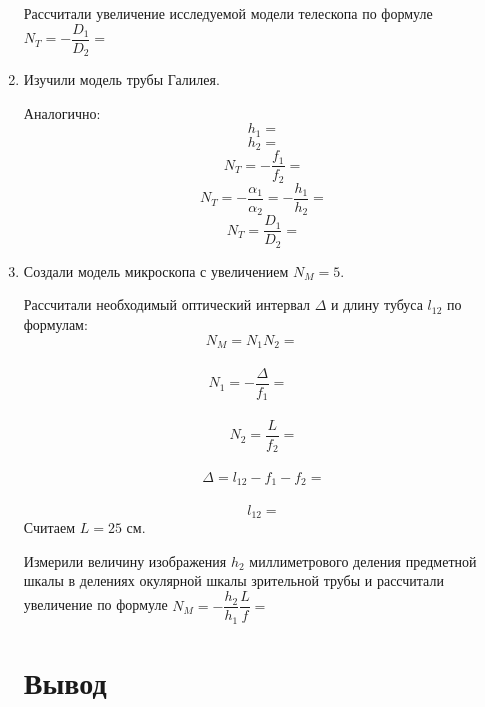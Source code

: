 \documentclass{letask}
\begin{document}
\begin{enumerate}
Рассчитали увеличение исследуемой модели телескопа по формуле $N_T = - \dfrac{D_1}{D_2} = $

\item Изучили модель трубы Галилея.

Аналогично:
\[ h_1= \]
\[ h_2= \]
\[N_T = -\dfrac{f_1}{f_2}= \]
\[N_T = -\dfrac{\alpha_1}{\alpha_2}=-\dfrac{h_1}{h_2} = \]
\[N_T = \dfrac{D_1}{D_2} = \]

\item Создали модель микроскопа с увеличением $N_M = 5$.

Рассчитали необходимый оптический интервал $\Delta$ и длину тубуса $l_{12}$  по формулам:\\
\[N_M = N_1N_2=\;\;\;\; \;\;\]
\vspace{0cm}\\
\[N_1 = - \dfrac{\Delta}{f_1}=\;\;\;\;\;\;\;\;\]
\vspace{0cm}\\
\[N_2 = \dfrac{L}{f_2} = \]
\vspace{0cm}\\
\[\Delta = l_{12} - f_1 - f_2 = \]
\vspace{0cm}\\
\[l_{12}=\]
Считаем $L=25$ см.

Измерили величину изображения $h_2$ миллиметрового деления предметной шкалы в делениях окулярной шкалы зрительной трубы и рассчитали увеличение по формуле $N_M = - \dfrac{h_2}{h_1} \dfrac{L}{f} = $

\section{Вывод}

\end{enumerate}
\end{document}
